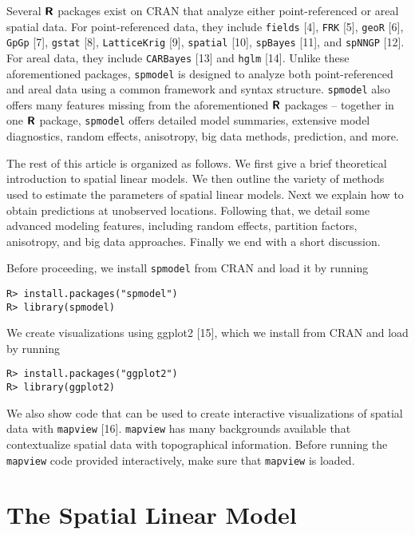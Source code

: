 \documentclass[10pt,letterpaper]{article}
\begin{document}
Several \(\textbf{\textsf{R}}\) packages exist on CRAN that analyze
either point-referenced or areal spatial data. For point-referenced
data, they include \texttt{fields} {[}4{]}, \texttt{FRK} {[}5{]},
\texttt{geoR} {[}6{]}, \texttt{GpGp} {[}7{]}, \texttt{gstat} {[}8{]},
\texttt{LatticeKrig} {[}9{]}, \texttt{spatial} {[}10{]},
\texttt{spBayes} {[}11{]}, and \texttt{spNNGP} {[}12{]}. For areal data,
they include \texttt{CARBayes} {[}13{]} and \texttt{hglm} {[}14{]}.
Unlike these aforementioned packages, \texttt{spmodel} is designed to
analyze both point-referenced and areal data using a common framework
and syntax structure. \texttt{spmodel} also offers many features missing
from the aforementioned \(\textbf{\textsf{R}}\) packages -- together in
one \(\textbf{\textsf{R}}\) package, \texttt{spmodel} offers detailed
model summaries, extensive model diagnostics, random effects,
anisotropy, big data methods, prediction, and more.

The rest of this article is organized as follows. We first give a brief
theoretical introduction to spatial linear models. We then outline the
variety of methods used to estimate the parameters of spatial linear
models. Next we explain how to obtain predictions at unobserved
locations. Following that, we detail some advanced modeling features,
including random effects, partition factors, anisotropy, and big data
approaches. Finally we end with a short discussion.

Before proceeding, we install \texttt{spmodel} from CRAN and load it by
running

\begin{verbatim}
R> install.packages("spmodel")
R> library(spmodel)
\end{verbatim}

We create visualizations using ggplot2 {[}15{]}, which we install from
CRAN and load by running

\begin{verbatim}
R> install.packages("ggplot2")
R> library(ggplot2)
\end{verbatim}

We also show code that can be used to create interactive visualizations
of spatial data with \texttt{mapview} {[}16{]}. \texttt{mapview} has
many backgrounds available that contextualize spatial data with
topographical information. Before running the \texttt{mapview} code
provided interactively, make sure that \texttt{mapview} is loaded.

\hypertarget{sec:theomodel}{%
\section{The Spatial Linear Model}\label{sec:theomodel}}
\end{document}
